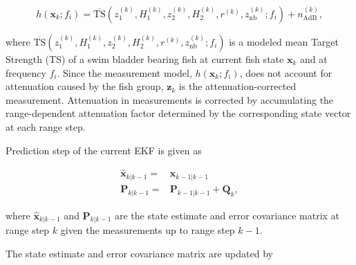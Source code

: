 \documentclass[technicalnote,oneauthor,latex,dvi2pdf,10pt,a4paper]{Definitions/mdpi}
\begin{document}
\begin{equation}
\label{eq:modelMeasureMember}
h\left(\mathbf{x}_k;f_i\right) = \overline{\text{TS}}\left(z_1^{(k)}, H_1^{(k)}, z_2^{(k)}, H_2^{(k)}, r^{(k)}, z_\text{nb}^{(k)};f_i\right) + n_\text{AdB}^{(k)},
\end{equation}

\noindent where $\overline{\text{TS}}\left(z_1^{(k)}, H_1^{(k)}, z_2^{(k)}, H_2^{(k)}, r^{(k)}, z_\text{nb}^{(k)};f_i\right)$ is a modeled mean Target Strength (TS) of a swim bladder bearing fish \cite{love1978resonant} at current fish state $\mathbf{x}_k$ and at frequency $f_i$.
Since the measurement model, $h\left(\mathbf{x}_k;f_i\right)$, does not account for attenuation caused by the fish group, $\mathbf{z}_k$ is the attenuation-corrected measurement.
Attenuation in measurements is corrected by accumulating the range-dependent attenuation factor determined by the corresponding state vector at each range step.

Prediction step of the current EKF is given as

\begin{align}
\label{eq:prediction}
\hat{\mathbf{x}}_{k|k-1} = & \hat{\mathbf{x}}_{k-1|k-1} \\ \nonumber
\boldsymbol{P}_{k|k-1} = & \boldsymbol{P}_{k-1|k-1} + \boldsymbol{Q}_k,
\end{align}

\noindent where $\hat{\mathbf{x}}_{k|k-1}$ and $\boldsymbol{P}_{k|k-1}$ are the state estimate and error covariance matrix at range step $k$ given the measurements up to range step $k-1$.

The state estimate and error covariance matrix are updated by
\end{document}
